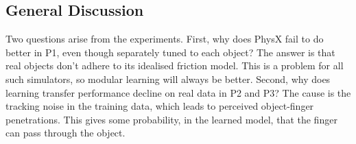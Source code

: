 \subsection{General Discussion} 

Two questions arise from the experiments. First, why does PhysX fail to do better in P1, even though separately tuned to each object? The answer is that real objects don't adhere to its idealised friction model. This is a problem for all such simulators, so modular learning will always be better. Second, why does learning transfer performance decline on real data in P2 and P3? The cause is the tracking noise in the training data, which leads to perceived object-finger penetrations. This gives some probability, in the learned model, that the finger can pass through the object. 















